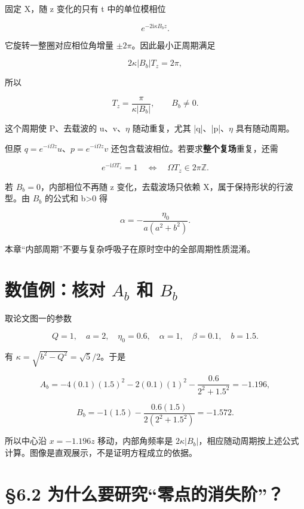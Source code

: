 固定 X，随 z 变化的只有 t 中的单位模相位\par

\[
e^{-2\mathrm{i}\kappa B_bz}.
\]

它旋转一整圈对应相位角增量 $\pm{}2\pi{}$。因此最小正周期满足\par

\[
2\kappa|B_b|T_z=2\pi,
\]

所以\par

\[
\boxed{
T_z=\dfrac{\pi}{\kappa|B_b|},
\qquad B_b\ne0.
}
\]

这个周期使 P、去载波的 u、v、$\eta{}$ 随动重复，尤其 |q|、|p|、$\eta{}$ 具有随动周期。\par

但原 $q=e^{-i\Omega{}z}u$、$p=e^{-i\Omega{}z}v$ 还包含载波相位。若要求\textbf{整个复场}重复，还需\par

\[
e^{-\mathrm{i}\Omega T_z}=1
\quad\Longleftrightarrow\quad
\Omega T_z\in2\pi\mathbb Z.
\]

若 $B_b=0$，内部相位不再随 z 变化，去载波场只依赖 X，属于保持形状的行波型。由 $B_b$ 的公式和 b>0 得\par

\[
\alpha=-\dfrac{\eta_0}{a(a^2+b^2)}.
\]

本章“内部周期”不要与复杂呼吸子在原时空中的全部周期性质混淆。\par

\section{数值例：核对 \texorpdfstring{$A_b$ 和 $B_b$}{Ab 和 Bb}}

取论文图一的参数\par

\[
Q=1,\quad a=2,\quad\eta_0=0.6,\quad
\alpha=1,\quad\beta=0.1,\quad b=1.5.
\]

有 $\kappa{}=\sqrt{b^{2}-Q^{2}}=\sqrt5/2$。于是\par

\[
A_b=-4(0.1)(1.5)^2-2(0.1)(1)^2
-\dfrac{0.6}{2^2+1.5^2}
=-1.196,
\]

\[
B_b=-1(1.5)-\dfrac{0.6(1.5)}{2(2^2+1.5^2)}
=-1.572.
\]

所以中心沿 $x=-1.196z$ 移动，内部角频率是 $2\kappa{}|B_b|$，相应随动周期按上述公式计算。图像是直观展示，不是证明方程成立的依据。\par

\section{§6.2 为什么要研究“零点的消失阶”？}

